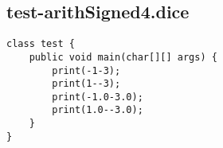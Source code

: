 \subsection{test-arithSigned4.dice}
\begin{verbatim}
class test {
	public void main(char[][] args) {
		print(-1-3);
		print(1--3);
		print(-1.0-3.0);
		print(1.0--3.0);
	}
}
\end{verbatim}